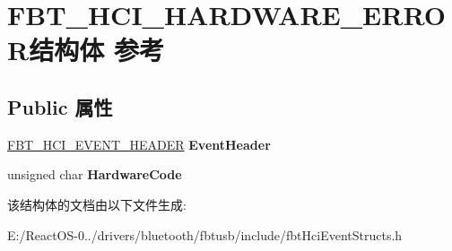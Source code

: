 \hypertarget{struct_f_b_t___h_c_i___h_a_r_d_w_a_r_e___e_r_r_o_r}{}\section{F\+B\+T\+\_\+\+H\+C\+I\+\_\+\+H\+A\+R\+D\+W\+A\+R\+E\+\_\+\+E\+R\+R\+O\+R结构体 参考}
\label{struct_f_b_t___h_c_i___h_a_r_d_w_a_r_e___e_r_r_o_r}
\subsection*{Public 属性}
\begin{DoxyCompactItemize}
\item 
\mbox{\label{struct_f_b_t___h_c_i___h_a_r_d_w_a_r_e___e_r_r_o_r_af7d3d7c304436b17215ece53f2b0d37b}} 
\hyperlink{struct_f_b_t___h_c_i___e_v_e_n_t___h_e_a_d_e_r}{F\+B\+T\+\_\+\+H\+C\+I\+\_\+\+E\+V\+E\+N\+T\+\_\+\+H\+E\+A\+D\+ER} {\bfseries Event\+Header}
\item 
\mbox{\label{struct_f_b_t___h_c_i___h_a_r_d_w_a_r_e___e_r_r_o_r_a9a3722f1dc82b363350580161c551794}} 
unsigned char {\bfseries Hardware\+Code}
\end{DoxyCompactItemize}


该结构体的文档由以下文件生成\+:\begin{DoxyCompactItemize}
\item 
E\+:/\+React\+O\+S-\/0../drivers/bluetooth/fbtusb/include/fbt\+Hci\+Event\+Structs.\+h\end{DoxyCompactItemize}
